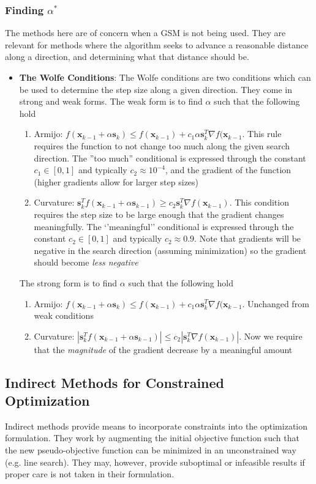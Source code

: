 \documentclass[12pt]{article}
\newcommand{\Item}[1]{\item \textbf{#1}:}
\newcommand{\boldx}{\mathbf{x}}
\begin{document}
\subsubsection{Finding $\alpha^*$}
The methods here are of concern when a GSM is not being used. They are relevant for methods where the algorithm seeks to advance a reasonable distance along a direction, and determining what that distance should be.
\begin{itemize}
\Item{The Wolfe Conditions} The Wolfe conditions are two conditions which can be used to determine the step size along a given direction. They come in strong and weak forms. The weak form is to find $\alpha$ such that the following hold
	\begin{enumerate}
	\item Armijo: $\boxed{f(\boldx_{k-1}+\alpha\mathbf{s}_k)\leq f(\boldx_{k-1})+c_1\alpha\mathbf{s}_k^T\nabla f(\boldx_{k-1}}$. This rule requires the function to not change too much along the given search direction. The ''too much'' conditional is expressed through the constant $c_1\in[0,1]$ and typically $c_2\approx 10^{-4}$, and the gradient of the function (higher gradients allow for larger step sizes)
	\item Curvature: $\boxed{\mathbf{s}_k^Tf(\boldx_{k-1}+\alpha\mathbf{s}_{k-1})\geq c_2\mathbf{s}_k^T\nabla f(\boldx_{k-1})}$. This condition requires the step size to be large enough that the gradient changes meaningfully. The `'meaningful'' conditional is expressed through the constant $c_2\in[0,1]$ and typically $c_2\approx0.9$. Note that gradients will be negative in the search direction (assuming minimization) so the gradient should become \emph{less negative}
	\end{enumerate}
	
	The strong form is to find $\alpha$ such that the following hold
	\begin{enumerate}
	\item Armijo: $\boxed{f(\boldx_{k-1}+\alpha\mathbf{s}_k)\leq f(\boldx_{k-1})+c_1\alpha\mathbf{s}_k^T\nabla f(\boldx_{k-1}}$. Unchanged from weak conditions
	\item Curvature: $\boxed{|\mathbf{s}_k^Tf(\boldx_{k-1}+\alpha\mathbf{s}_{k-1})|\leq c_2|\mathbf{s}_k^T\nabla f(\boldx_{k-1})|}$. Now we require that the \emph{magnitude} of the gradient decrease by a meaningful amount 
	\end{enumerate}
\end{itemize}

\subsection{Indirect Methods for Constrained Optimization}
Indirect methods provide means to incorporate constraints into the optimization formulation. They work by augmenting the initial objective function such that the new pseudo-objective function can be minimized in an unconstrained way (e.g. line search). They may, however, provide suboptimal or infeasible results if proper care is not taken in their formulation.
\end{document}
